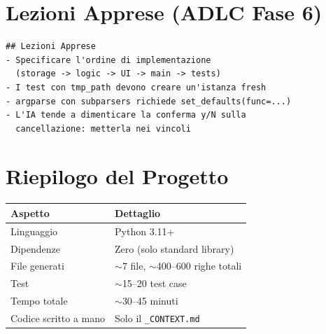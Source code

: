 \section{Lezioni Apprese (ADLC Fase 6)}

\begin{lstlisting}[language={},title={Lezioni da aggiungere al contesto}]
## Lezioni Apprese
- Specificare l'ordine di implementazione
  (storage -> logic -> UI -> main -> tests)
- I test con tmp_path devono creare un'istanza fresh
- argparse con subparsers richiede set_defaults(func=...)
- L'IA tende a dimenticare la conferma y/N sulla
  cancellazione: metterla nei vincoli
\end{lstlisting}

\section*{Riepilogo del Progetto}

\begin{center}
\begin{tabularx}{\textwidth}{l X}
\toprule
\textbf{Aspetto} & \textbf{Dettaglio} \\
\midrule
Linguaggio & Python 3.11+ \\
Dipendenze & Zero (solo standard library) \\
File generati & $\sim$7 file, $\sim$400--600 righe totali \\
Test & $\sim$15--20 test case \\
Tempo totale & $\sim$30--45 minuti \\
Codice scritto a mano & Solo il \texttt{\_CONTEXT.md} \\
\bottomrule
\end{tabularx}
\end{center}
